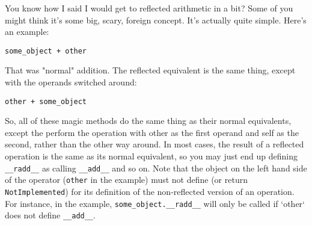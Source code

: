 \documentclass[a4paper,11pt]{article}
\newcommand{\code}[1]{\texttt{#1}}
\begin{document}
You know how I said I would get to reflected arithmetic in a bit? Some of you might think it's some big, scary, foreign concept. It's actually quite simple. Here's an example:

\begin{lstlisting}
some_object + other
\end{lstlisting}

\noindent
That was "normal" addition. The reflected equivalent is the same thing, except with the operands switched around:

\begin{lstlisting}
other + some_object
\end{lstlisting}

\noindent
So, all of these magic methods do the same thing as their normal equivalents, except the perform the operation with other as the first operand and self as the second, rather than the other way around. In most cases, the result of a reflected operation is the same as its normal equivalent, so you may just end up defining \code{__radd__} as calling \code{__add__} and so on. Note that the object on the left hand side of the operator (\code{other} in the example) must not define (or return \code{NotImplemented}) for its definition of the non-reflected version of an operation. For instance, in the example, \code{some_object.__radd__} will only be called if `other` does not define \code{__add__}.
\end{document}
